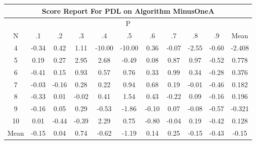 \documentclass[11pt,a4paper]{report}
\begin{document}
\begin{longtable}{ | c || c | c | c | c | c | c | c | c | c || c |}
\hline
\multicolumn{11}{|c|}{ Score Report For PDL on Algorithm MinusOneA} \\
\hline
\multicolumn{11}{|c|}{ P } \\
\hline
N & .1 & .2 & .3 & .4 & .5 & .6 & .7 & .8 & .9 & Mean\\
 \hline
 \hline
 \endhead
  4 &  \cellcolor[HTML]{FFF7F7} -0.34 &  \cellcolor[HTML]{F7F7FF} 0.42 &  \cellcolor[HTML]{E7E7FF} 1.11 &  \cellcolor[HTML]{FF0000} -10.00 &  \cellcolor[HTML]{FF0000} -10.00 &  \cellcolor[HTML]{F7F7FF} 0.36 &  \cellcolor[HTML]{FFFFFF} -0.07 &  \cellcolor[HTML]{FFBFBF} -2.55 &  \cellcolor[HTML]{FFEFEF} -0.60 & -2.408 \\
  5 &  \cellcolor[HTML]{F7F7FF} 0.19 &  \cellcolor[HTML]{F7F7FF} 0.27 &  \cellcolor[HTML]{B7B7FF} 2.95 &  \cellcolor[HTML]{BFBFFF} 2.68 &  \cellcolor[HTML]{FFEFEF} -0.49 &  \cellcolor[HTML]{FFFFFF} 0.08 &  \cellcolor[HTML]{E7E7FF} 0.87 &  \cellcolor[HTML]{E7E7FF} 0.97 &  \cellcolor[HTML]{FFEFEF} -0.52 & 0.778 \\
  6 &  \cellcolor[HTML]{FFF7F7} -0.41 &  \cellcolor[HTML]{FFFFFF} 0.15 &  \cellcolor[HTML]{E7E7FF} 0.93 &  \cellcolor[HTML]{EFEFFF} 0.57 &  \cellcolor[HTML]{EFEFFF} 0.76 &  \cellcolor[HTML]{F7F7FF} 0.33 &  \cellcolor[HTML]{E7E7FF} 0.99 &  \cellcolor[HTML]{F7F7FF} 0.34 &  \cellcolor[HTML]{FFF7F7} -0.28 & 0.376 \\
  7 &  \cellcolor[HTML]{FFFFFF} -0.03 &  \cellcolor[HTML]{FFF7F7} -0.16 &  \cellcolor[HTML]{F7F7FF} 0.28 &  \cellcolor[HTML]{F7F7FF} 0.22 &  \cellcolor[HTML]{E7E7FF} 0.94 &  \cellcolor[HTML]{EFEFFF} 0.68 &  \cellcolor[HTML]{F7F7FF} 0.19 &  \cellcolor[HTML]{FFFFFF} -0.01 &  \cellcolor[HTML]{FFF7F7} -0.46 & 0.182 \\
  8 &  \cellcolor[HTML]{FFF7F7} -0.33 &  \cellcolor[HTML]{FFFFFF} 0.01 &  \cellcolor[HTML]{FFFFFF} -0.02 &  \cellcolor[HTML]{F7F7FF} 0.41 &  \cellcolor[HTML]{D7D7FF} 1.54 &  \cellcolor[HTML]{F7F7FF} 0.43 &  \cellcolor[HTML]{FFF7F7} -0.22 &  \cellcolor[HTML]{FFFFFF} 0.09 &  \cellcolor[HTML]{FFFFFF} -0.16 & 0.196 \\
  9 &  \cellcolor[HTML]{FFF7F7} -0.16 &  \cellcolor[HTML]{FFFFFF} 0.05 &  \cellcolor[HTML]{F7F7FF} 0.29 &  \cellcolor[HTML]{FFEFEF} -0.53 &  \cellcolor[HTML]{FFCFCF} -1.86 &  \cellcolor[HTML]{FFFFFF} -0.10 &  \cellcolor[HTML]{FFFFFF} 0.07 &  \cellcolor[HTML]{FFFFFF} -0.08 &  \cellcolor[HTML]{FFEFEF} -0.57 & -0.321 \\
  10 &  \cellcolor[HTML]{FFFFFF} 0.01 &  \cellcolor[HTML]{FFF7F7} -0.44 &  \cellcolor[HTML]{FFF7F7} -0.39 &  \cellcolor[HTML]{C7C7FF} 2.29 &  \cellcolor[HTML]{EFEFFF} 0.75 &  \cellcolor[HTML]{FFE7E7} -0.80 &  \cellcolor[HTML]{FFFFFF} -0.04 &  \cellcolor[HTML]{F7F7FF} 0.19 &  \cellcolor[HTML]{FFF7F7} -0.42 & 0.128 \\
 \hline
 \hline
Mean &  \cellcolor[HTML]{FFFFFF} -0.15 &  \cellcolor[HTML]{FFFFFF} 0.04 &  \cellcolor[HTML]{EFEFFF} 0.74 &  \cellcolor[HTML]{FFEFEF} -0.62 &  \cellcolor[HTML]{FFDFDF} -1.19 &  \cellcolor[HTML]{FFFFFF} 0.14 &  \cellcolor[HTML]{F7F7FF} 0.25 &  \cellcolor[HTML]{FFFFFF} -0.15 &  \cellcolor[HTML]{FFF7F7} -0.43 &  \cellcolor[HTML]{FFFFFF} -0.15
\end{longtable}
\end{document}
